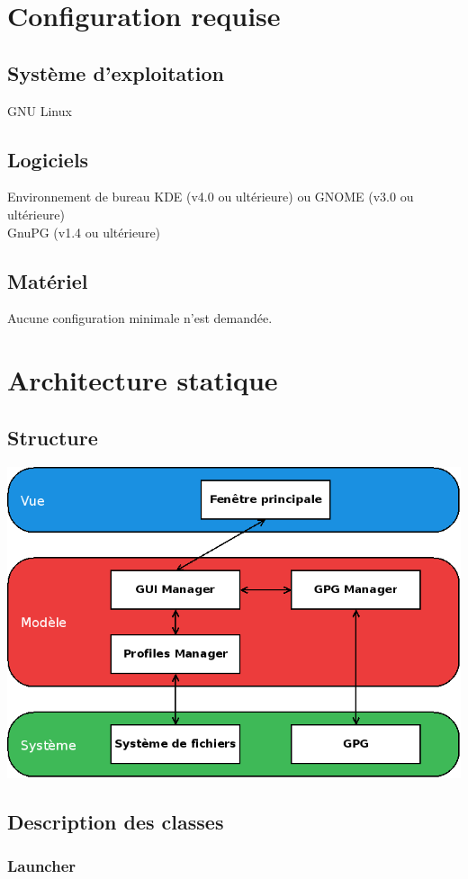 \documentclass{../res/univ-projet}
\begin{document}
\section{Configuration requise}
  \subsection{Système d'exploitation}
    GNU Linux
  \subsection{Logiciels}
    Environnement de bureau KDE (v4.0 ou ultérieure) ou GNOME (v3.0 ou ultérieure)\\
    GnuPG (v1.4 ou ultérieure)
  \subsection{Matériel}
    Aucune configuration minimale n'est demandée.

\section{Architecture statique}
  \subsection{Structure} %
    \includegraphics[scale=0.5]{graphics/diagramme_archi.png}
  \newpage
  \subsection{Description des classes} %
      
      \subsubsection{Launcher}
\end{document}
